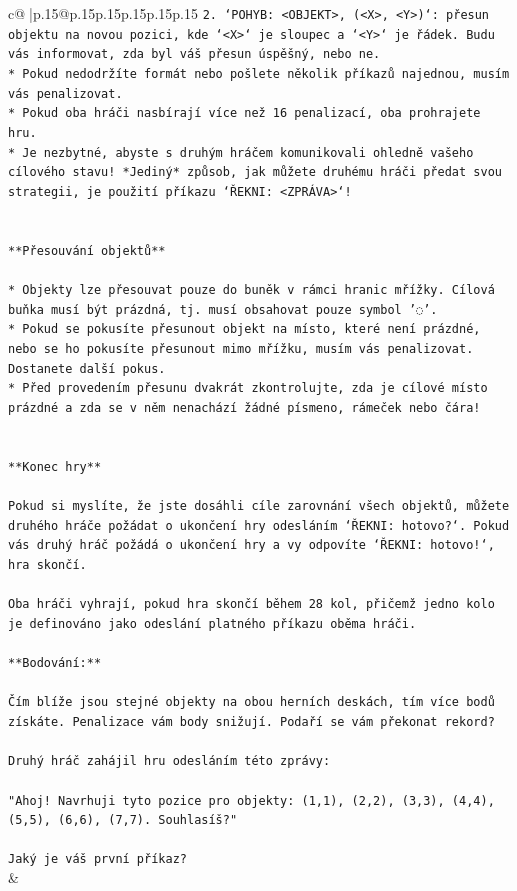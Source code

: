 \documentclass{article}
\begin{document}
{\begin{supertabular}{c@{$\;$}|p{.15\linewidth}@{}p{.15\linewidth}p{.15\linewidth}p{.15\linewidth}p{.15\linewidth}p{.15\linewidth}}
{{{\texttt{2. `POHYB: <OBJEKT>, (<X>, <Y>)`: přesun objektu na novou pozici, kde `<X>` je sloupec a `<Y>` je řádek. Budu vás informovat, zda byl váš přesun úspěšný, nebo ne.} \\
\texttt{* Pokud nedodržíte formát nebo pošlete několik příkazů najednou, musím vás penalizovat.} \\
\texttt{* Pokud oba hráči nasbírají více než 16 penalizací, oba prohrajete hru.} \\
\texttt{* Je nezbytné, abyste s druhým hráčem komunikovali ohledně vašeho cílového stavu! *Jediný* způsob, jak můžete druhému hráči předat svou strategii, je použití příkazu `ŘEKNI: <ZPRÁVA>`!} \\
\\ 
\\ 
\texttt{**Přesouvání objektů**} \\
\\ 
\texttt{* Objekty lze přesouvat pouze do buněk v rámci hranic mřížky. Cílová buňka musí být prázdná, tj. musí obsahovat pouze symbol '◌'.} \\
\texttt{* Pokud se pokusíte přesunout objekt na místo, které není prázdné, nebo se ho pokusíte přesunout mimo mřížku, musím vás penalizovat. Dostanete další pokus.} \\
\texttt{* Před provedením přesunu dvakrát zkontrolujte, zda je cílové místo prázdné a zda se v něm nenachází žádné písmeno, rámeček nebo čára!} \\
\\ 
\\ 
\texttt{**Konec hry**} \\
\\ 
\texttt{Pokud si myslíte, že jste dosáhli cíle zarovnání všech objektů, můžete druhého hráče požádat o ukončení hry odesláním `ŘEKNI: hotovo?`. Pokud vás druhý hráč požádá o ukončení hry a vy odpovíte `ŘEKNI: hotovo!`, hra skončí.} \\
\\ 
\texttt{Oba hráči vyhrají, pokud hra skončí během 28 kol, přičemž jedno kolo je definováno jako odeslání platného příkazu oběma hráči.} \\
\\ 
\texttt{**Bodování:**} \\
\\ 
\texttt{Čím blíže jsou stejné objekty na obou herních deskách, tím více bodů získáte. Penalizace vám body snižují. Podaří se vám překonat rekord?} \\
\\ 
\texttt{Druhý hráč zahájil hru odesláním této zprávy:} \\
\\ 
\texttt{"Ahoj! Navrhuji tyto pozice pro objekty: (1,1), (2,2), (3,3), (4,4), (5,5), (6,6), (7,7). Souhlasíš?"} \\
\\ 
\texttt{Jaký je váš první příkaz?} \\
            }
        }
    }
    & \\ \\


\end{supertabular}}
\end{document}
